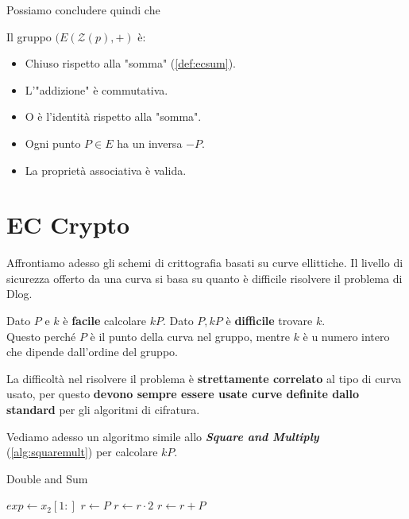 Possiamo concludere quindi che 
\begin{theorem}[$E(\mathcal{Z}(p),+$]
Il gruppo $(E(\mathcal{Z}(p),+)$ è:
\begin{itemize}
    \item Chiuso rispetto alla "somma" (\cref{def:ecsum}).
    \item L'"addizione" è commutativa.
    \item O è l'identità rispetto alla "somma".
    \item Ogni punto $P\in E$ ha un inversa $-P$.
    \item La proprietà associativa è valida.
\end{itemize}
\end{theorem}

\section{EC Crypto}
Affrontiamo adesso gli schemi di crittografia basati su curve ellittiche. Il livello di sicurezza offerto da una curva si basa su quanto è difficile risolvere il problema di Dlog.
\begin{theorem}\label{thm:ecdlp}
Dato $P$ e $k$ è \textbf{facile} calcolare $kP$\footnotemark. Dato $P,kP$ è \textbf{difficile} trovare $k$.\\
Questo perché $P$ è il punto della curva nel gruppo, mentre $k$ è u numero intero che dipende dall'ordine del gruppo.
\end{theorem}
\begin{corollary}
La difficoltà nel risolvere il problema è \textbf{strettamente correlato} al tipo di curva usato, per questo \textbf{devono sempre essere usate curve definite dallo standard} per gli algoritmi di cifratura.
\end{corollary}
Vediamo adesso un algoritmo simile allo \textit{\textbf{Square and Multiply}} (\cref{alg:squaremult}) per calcolare $kP$.
\begin{algorithm}
\caption{Double and Sum}\label{alg:doublesum}
\begin{algorithmic}[1]
\State $exp\gets x_2[1:]$
\State $r\gets P$
    \State $r\gets r\cdot2$
       \State $r\gets r+ P$
    \EndIf  
\EndFor
\EndProcedure
\end{algorithmic}
\end{algorithm}
